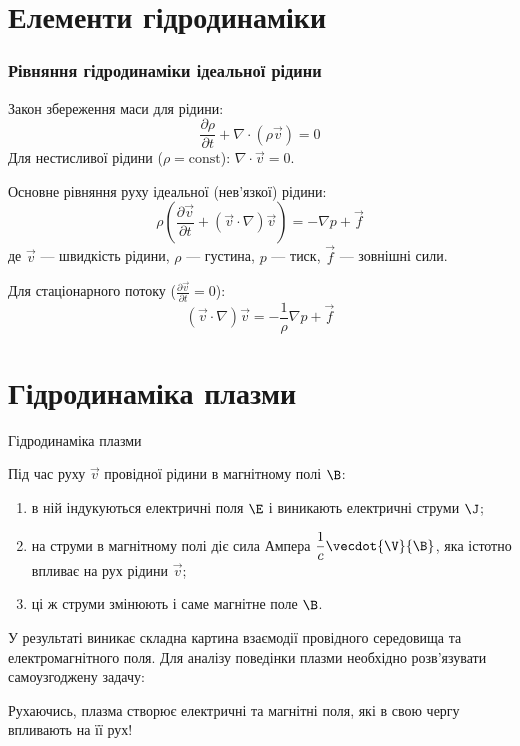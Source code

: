\documentclass[]{beamer}
\begin{document}
\section{Елементи гідродинаміки}

\begin{frame}
	\frametitle{Рівняння гідродинаміки ідеальної рідини}

	Закон збереження маси для рідини:
	\[
		\frac{\partial \rho}{\partial t} + \nabla \cdot (\rho \vec{v}) = 0
	\]
	Для нестисливої рідини ($\rho = \text{const}$): $\nabla \cdot \vec{v} = 0$.

	Основне рівняння руху ідеальної (нев'язкої) рідини:
	\[
		\rho\left( \frac{\partial \vec{v}}{\partial t} + (\vec{v} \cdot \nabla) \vec{v} \right) = -\nabla
		p + \vec{f}
	\]
	де $\vec{v}$ --- швидкість рідини, $\rho$ --- густина, $p$ --- тиск, $\vec{f}$ --- зовнішні сили.

	Для стаціонарного потоку ($\frac{\partial \vec{v}}{\partial t} = 0$):
	\[
		(\vec{v} \cdot \nabla) \vec{v} = -\frac{1}{\rho} \nabla p + \vec{f}
	\]

\end{frame}

\section{Гідродинаміка плазми}

\begin{frame}{Гідродинаміка плазми}{}
	\begin{block}{}\justifying
		Під час руху $\vec{v}$ провідної рідини в магнітному полі $\B$:
		\begin{enumerate}
			\item в ній індукуються електричні поля $\E$ і виникають електричні струми $\J$;
			\item на струми в магнітному полі діє сила Ампера $\dfrac1c\vecdot{\V}{\B}$, яка істотно впливає на рух рідини $\vec{v}$;
			\item ці ж струми змінюють і саме магнітне поле $\B$.
		\end{enumerate}
		У результаті виникає складна картина взаємодії провідного середовища та електромагнітного
		поля. Для аналізу поведінки плазми необхідно розв'язувати самоузгоджену задачу:
	\end{block}
\begin{alertblock}{}\centering
    Рухаючись, плазма створює електричні та магнітні поля, які в свою чергу впливають на її рух!
\end{alertblock}
\end{frame}
\end{document}
